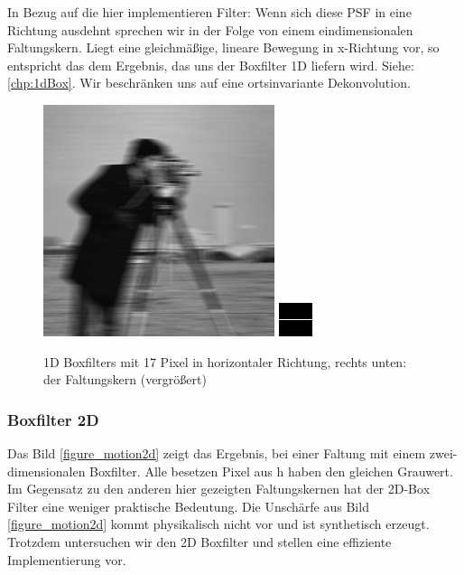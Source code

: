 \documentclass[a4paper,12pt]{article}
\begin{document}
In Bezug auf die hier implementieren Filter: Wenn sich diese PSF in eine
Richtung ausdehnt sprechen wir in der Folge von einem eindimensionalen Faltungskern. 
Liegt eine gleichmäßige, lineare Bewegung in
x-Richtung vor, so entspricht das dem Ergebnis, das uns der Boxfilter 1D
liefern wird. Siehe: \ref{chp:1dBox}. Wir beschränken uns auf eine 
ortsinvariante Dekonvolution.

\begin{figure}[htbp]
\centering
\includegraphics[scale=0.8]{move17.png}
\includegraphics[scale=2]{kern1D37px.png}
\caption{1D Boxfilters mit 17 Pixel in horizontaler Richtung, rechts unten:
der Faltungskern (vergrößert)}
\label{figure_motion}
\end{figure}



\subsubsection{Boxfilter 2D}
Das Bild \ref{figure_motion2d} zeigt das Ergebnis, bei einer Faltung mit einem zwei-dimensionalen Boxfilter. Alle besetzen Pixel aus h haben den gleichen
Grauwert. Im Gegensatz zu den anderen hier gezeigten Faltungskernen hat der
2D-Box Filter eine weniger praktische Bedeutung. Die Unschärfe aus Bild
\ref{figure_motion2d} kommt physikalisch nicht vor und ist synthetisch erzeugt.
Trotzdem untersuchen wir den 2D Boxfilter und stellen eine effiziente
Implementierung vor.
\end{document}
